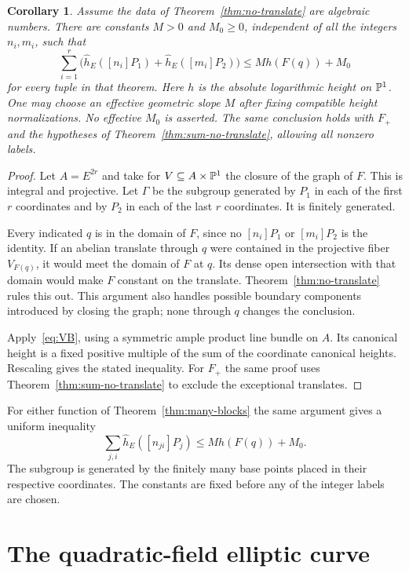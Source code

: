 \documentclass[11pt,a4paper]{article}
\newtheorem{corollary}[theorem]{Corollary}
\begin{document}
\begin{corollary}\label{cor:height}
Assume the data of Theorem~\ref{thm:no-translate} are algebraic
numbers. There are constants $M>0$ and $M_0\ge0$, independent
of all the integers $n_i,m_i$, such that
\[
 \sum_{i=1}^r\bigl(\widehat h_E([n_i]P_1)
                 +\widehat h_E([m_i]P_2)\bigr)
 \le M h(F(q))+M_0
\]
for every tuple in that theorem. Here $h$ is the absolute
logarithmic height on $\mathbb P^1$. One may choose an effective
geometric slope $M$ after fixing compatible height
normalizations. No effective $M_0$ is asserted.
The same conclusion holds with $F_+$ and the hypotheses of
Theorem~\ref{thm:sum-no-translate}, allowing all nonzero labels.
\end{corollary}
\begin{proof}
Let $A=E^{2r}$ and take for $V\subseteq A\times\mathbb P^1$ the
closure of the graph of $F$. This is integral and projective.
Let $\Gamma$ be the subgroup generated by $P_1$ in each of
the first $r$ coordinates and by $P_2$ in each of the last
$r$ coordinates. It is finitely generated.

Every indicated $q$ is in the domain of $F$, since no
$[n_i]P_1$ or $[m_i]P_2$ is the identity. If an abelian
translate through $q$ were contained in the projective fiber
$V_{F(q)}$, it would meet the domain of $F$ at $q$. Its dense
open intersection with that domain would make $F$ constant
on the translate. Theorem~\ref{thm:no-translate} rules this
out. This argument also handles possible boundary components
introduced by closing the graph; none through $q$ changes
the conclusion.

Apply~\eqref{eq:VB}, using a symmetric ample product line
bundle on $A$. Its canonical height is a fixed positive
multiple of the sum of the coordinate canonical heights.
Rescaling gives the stated inequality. For $F_+$ the same
proof uses Theorem~\ref{thm:sum-no-translate} to exclude the
exceptional translates.
\end{proof}

For either function of Theorem~\ref{thm:many-blocks} the same
argument gives a uniform inequality
\[
 \sum_{j,i}\widehat h_E([n_{ji}]P_j)
       \le M h(F(q))+M_0.
\]
The subgroup is generated by the finitely many base points
placed in their respective coordinates. The constants are
fixed before any of the integer labels are chosen.

\section{The quadratic-field elliptic curve}
\end{document}
